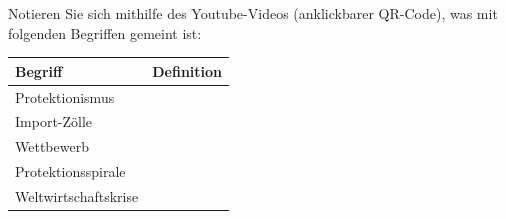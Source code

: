 \begin{myexercise}
    Notieren Sie sich mithilfe des Youtube-Videos (anklickbarer QR-Code), was mit folgenden Begriffen gemeint ist:

    \begin{table}[H]
        \centering\small
        \begin{tabular}{l|p{10cm}}
            \textbf{Begriff}     & \textbf{Definition} \\
            \midrule\midrule
            Protektionismus      &                     \\[1.3cm]\midrule
            Import-Zölle         &                     \\[1.3cm]\midrule
            Wettbewerb           &                     \\[1.3cm]\midrule
            Protektionsspirale   &                     \\[1.3cm]\midrule
            Weltwirtschaftskrise &                     \\[1.3cm]
        \end{tabular}
    \end{table}


\end{myexercise}

